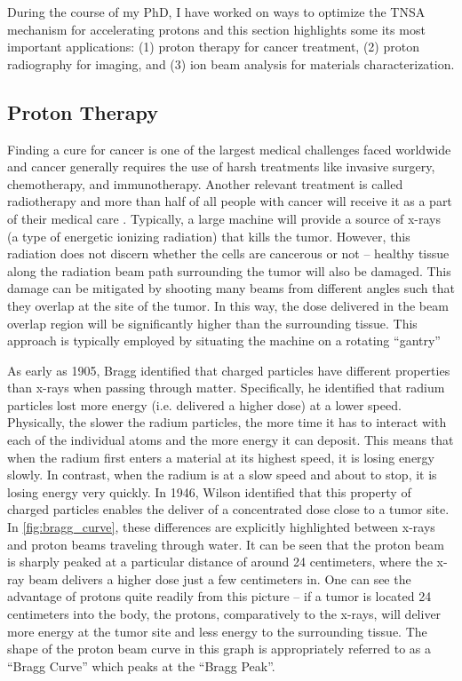 During the course of my PhD, I have worked on ways to optimize the \gls{TNSA} mechanism for accelerating protons and this section highlights some its most important applications: (1) proton therapy for cancer treatment, (2) proton radiography for imaging, and (3) ion beam analysis for materials characterization.


\subsection{Proton Therapy}

Finding a cure for cancer is one of the largest medical challenges faced worldwide and cancer generally requires the use of harsh treatments like invasive surgery, chemotherapy, and immunotherapy. Another relevant treatment is called radiotherapy and more than half of all people with cancer will receive it as a part of their medical care \cite{Mayo_2024_Cancer}. Typically, a large machine will provide a source of x-rays (a type of energetic ionizing radiation) that kills the tumor. However, this radiation does not discern whether the cells are cancerous or not -- healthy tissue along the radiation beam path surrounding the tumor will also be damaged. This damage can be mitigated by shooting many beams from different angles such that they overlap at the site of the tumor. In this way, the dose delivered in the beam overlap region will be significantly higher than the surrounding tissue. This approach is typically employed by situating the machine on a rotating ``gantry''

As early as 1905, Bragg \cite{Bragg_1905_JOS} identified that charged particles have different properties than x-rays when passing through matter. Specifically, he identified that radium particles lost more energy (i.e. delivered a higher dose) at a lower speed. Physically, the slower the radium particles, the more time it has to interact with each of the individual atoms and the more energy it can deposit. This means that when the radium first enters a material at its highest speed, it is losing energy slowly. In contrast, when the radium is at a slow speed and about to stop, it is losing energy very quickly. In 1946, Wilson \cite{Wilson_1946_Rad} identified that this property of charged particles enables the deliver of a concentrated dose close to a tumor site. In \autoref{fig:bragg_curve}, these differences are explicitly highlighted between x-rays and proton beams traveling through water. It can be seen that the proton beam is sharply peaked at a particular distance of around 24 centimeters, where the x-ray beam delivers a higher dose just a few centimeters in. One can see the advantage of protons quite readily from this picture -- if a tumor is located 24 centimeters into the body, the protons, comparatively to the x-rays, will deliver more energy at the tumor site and less energy to the surrounding tissue. The shape of the proton beam curve in this graph is appropriately referred to as a ``Bragg Curve'' which peaks at the ``Bragg Peak''. 

